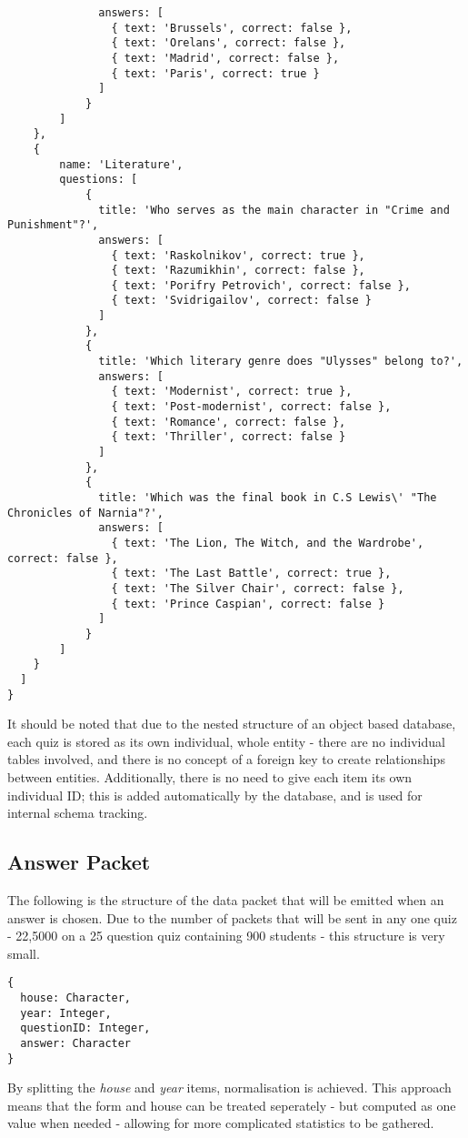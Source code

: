\begin{verbatim}
  			  answers: [
  			    { text: 'Brussels', correct: false },
  			    { text: 'Orelans', correct: false },
  			    { text: 'Madrid', correct: false },
  			    { text: 'Paris', correct: true }
  			  ]
  			}
  		]
  	},
  	{
  		name: 'Literature',
  		questions: [
  			{
  			  title: 'Who serves as the main character in "Crime and Punishment"?',
  			  answers: [
  			    { text: 'Raskolnikov', correct: true },
  			    { text: 'Razumikhin', correct: false },
  			    { text: 'Porifry Petrovich', correct: false },
  			    { text: 'Svidrigailov', correct: false }
  			  ]
  			},
  			{
  			  title: 'Which literary genre does "Ulysses" belong to?',
  			  answers: [
  			    { text: 'Modernist', correct: true },
  			    { text: 'Post-modernist', correct: false },
  			    { text: 'Romance', correct: false },
  			    { text: 'Thriller', correct: false }
  			  ]
  			},
  			{
  			  title: 'Which was the final book in C.S Lewis\' "The Chronicles of Narnia"?',
  			  answers: [
  			    { text: 'The Lion, The Witch, and the Wardrobe', correct: false },
  			    { text: 'The Last Battle', correct: true },
  			    { text: 'The Silver Chair', correct: false },
  			    { text: 'Prince Caspian', correct: false }
  			  ]
  			}
  		]
  	}
  ]
}
\end{verbatim}

It should be noted that due to the nested structure of an object based database, each quiz is stored as its own individual, whole entity - there are no individual tables involved, and there is no concept of a foreign key to create relationships between entities. Additionally, there is no need to give each item its own individual ID; this is added automatically by the database, and is used for internal schema tracking.

\subsection{Answer Packet}
The following is the structure of the data packet that will be emitted when an answer is chosen. Due to the number of packets that will be sent in any one quiz - 22,5000 on a 25 question quiz containing 900 students - this structure is very small.

\begin{Verbatim}[fontsize=\small]
{
  house: Character,
  year: Integer,
  questionID: Integer,
  answer: Character
}
\end{Verbatim}
By splitting the \textit{house} and \textit{year} items, normalisation is achieved. This approach means that the form and house can be treated seperately - but computed as one value when needed - allowing for more complicated statistics to be gathered.
